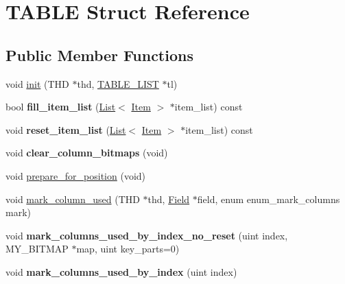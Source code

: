 \hypertarget{structTABLE}{}\section{T\+A\+B\+LE Struct Reference}
\label{structTABLE}
\subsection*{Public Member Functions}
\begin{DoxyCompactItemize}
\item 
void \mbox{\hyperlink{structTABLE_a4c6c0d87326e6006abe59c861c947ad3}{init}} (T\+HD $\ast$thd, \mbox{\hyperlink{structTABLE__LIST}{T\+A\+B\+L\+E\+\_\+\+L\+I\+ST}} $\ast$tl)
\item 
\mbox{\label{structTABLE_a75fd468ce3ac5db1274edba60e8b2773}} 
bool {\bfseries fill\+\_\+item\+\_\+list} (\mbox{\hyperlink{classList}{List}}$<$ \mbox{\hyperlink{classItem}{Item}} $>$ $\ast$item\+\_\+list) const
\item 
\mbox{\label{structTABLE_a544afc7debef1d4b41a7a84416c93cc4}} 
void {\bfseries reset\+\_\+item\+\_\+list} (\mbox{\hyperlink{classList}{List}}$<$ \mbox{\hyperlink{classItem}{Item}} $>$ $\ast$item\+\_\+list) const
\item 
\mbox{\label{structTABLE_a1a0b5080e41bde51d498bf5c50eef31b}} 
void {\bfseries clear\+\_\+column\+\_\+bitmaps} (void)
\item 
void \mbox{\hyperlink{structTABLE_aeae1505f7281ef739f97287727b4685e}{prepare\+\_\+for\+\_\+position}} (void)
\item 
void \mbox{\hyperlink{structTABLE_a864f1784006008c88847ba29dc09e30e}{mark\+\_\+column\+\_\+used}} (T\+HD $\ast$thd, \mbox{\hyperlink{classField}{Field}} $\ast$field, enum enum\+\_\+mark\+\_\+columns mark)
\item 
\mbox{\label{structTABLE_a4656894cb85a96fa480ee184baac0497}} 
void {\bfseries mark\+\_\+columns\+\_\+used\+\_\+by\+\_\+index\+\_\+no\+\_\+reset} (uint index, M\+Y\+\_\+\+B\+I\+T\+M\+AP $\ast$map, uint key\+\_\+parts=0)
\item 
\mbox{\label{structTABLE_a003bb64333b08fc537981677ea61b04c}} 
void {\bfseries mark\+\_\+columns\+\_\+used\+\_\+by\+\_\+index} (uint index)
\item 

\end{DoxyCompactItemize}
